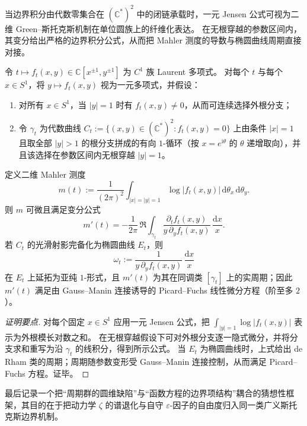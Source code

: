 当边界积分由代数零集合在 \((\mathbb C^\ast)^2\) 中的闭链承载时，一元 Jensen 公式可视为二维 Green--斯托克斯机制在单位圆族上的纤维化表达。
在无根穿越的参数区间内，其变分给出严格的边界积分公式，从而把 Mahler 测度的导数与椭圆曲线周期直接对接。

\begin{theorem}\label{thm:conclusion-leyang-jensen-stokes-variational}
令 \(t\mapsto f_t(x,y)\in\mathbb C[x^{\pm1},y^{\pm1}]\) 为 \(C^1\) 族 Laurent 多项式。
对每个 \(t\) 与每个 \(x\in S^1\)，将 \(y\mapsto f_t(x,y)\) 视为一元多项式，并假设：
\begin{enumerate}
  \item 对所有 \(x\in S^1\)，当 \(|y|=1\) 时有 \(f_t(x,y)\neq 0\)，从而可连续选择外根分支；
  \item 令 \(\gamma_t\) 为代数曲线 \(C_t:=\{(x,y)\in(\mathbb C^*)^2:f_t(x,y)=0\}\) 上由条件 \(|x|=1\) 且取全部 \(|y|>1\) 的根分支拼成的有向 \(1\)-循环（按 \(x=e^{\mathrm i\theta}\) 的 \(\theta\) 递增取向），并且该选择在参数区间内无根穿越 \(|y|=1\)。
\end{enumerate}
定义二维 Mahler 测度
\[
m(t):=\frac1{(2\pi)^2}\int_{|x|=|y|=1}\log|f_t(x,y)|\,\mathrm d\theta_x\,\mathrm d\theta_y.
\]
则 \(m\) 可微且满足变分公式
\[
m'(t)
=-\frac1{2\pi}\,\Re\int_{\gamma_t}\frac{\partial_t f_t(x,y)}{y\,\partial_y f_t(x,y)}\,\frac{\mathrm d x}{x}.
\]
若 \(C_t\) 的光滑射影完备化为椭圆曲线 \(E_t\)，则
\[
\omega_t:=\frac{1}{y\,\partial_y f_t(x,y)}\,\frac{\mathrm d x}{x}
\]
在 \(E_t\) 上延拓为亚纯 \(1\)-形式，且 \(m'(t)\) 为其在同调类 \([\gamma_t]\) 上的实周期；因此 \(m'(t)\) 满足由 Gauss--Manin 连接诱导的 Picard--Fuchs 线性微分方程（阶至多 \(2\)）。
\end{theorem}
\begin{proof}[证明要点]
对每个固定 \(x\in S^1\) 应用一元 Jensen 公式，把 \(\int_{|y|=1}\log|f_t(x,y)|\) 表示为外根模长对数之和。
在无根穿越假设下可对外根分支逐一隐式微分，并将分支求和重写为沿 \(\gamma_t\) 的线积分，得到所示公式。
当 \(E_t\) 为椭圆曲线时，上式给出 de Rham 类的周期；周期随参数变形受 Gauss--Manin 连接控制，从而满足 Picard--Fuchs 方程。证毕。
\end{proof}

最后记录一个把“周期群的圆维缺陷”与“函数方程的边界项结构”耦合的猜想性框架，其目的在于把动力学 \(\zeta\) 的谱退化与自守 \(\varepsilon\)-因子的自由度归入同一类广义斯托克斯边界机制。

